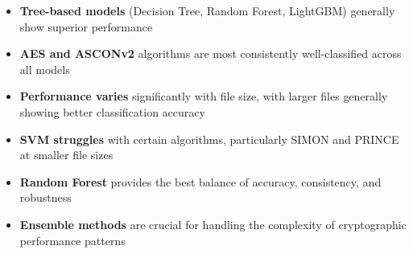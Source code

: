 \documentclass[12pt]{article}
\begin{document}
\begin{itemize}
    \item \textbf{Tree-based models} (Decision Tree, Random Forest, LightGBM) generally show superior performance
    \item \textbf{AES and ASCONv2} algorithms are most consistently well-classified across all models
    \item \textbf{Performance varies} significantly with file size, with larger files generally showing better classification accuracy
    \item \textbf{SVM struggles} with certain algorithms, particularly SIMON and PRINCE at smaller file sizes
    \item \textbf{Random Forest} provides the best balance of accuracy, consistency, and robustness
    \item \textbf{Ensemble methods} are crucial for handling the complexity of cryptographic performance patterns
\end{itemize}
\end{document}
